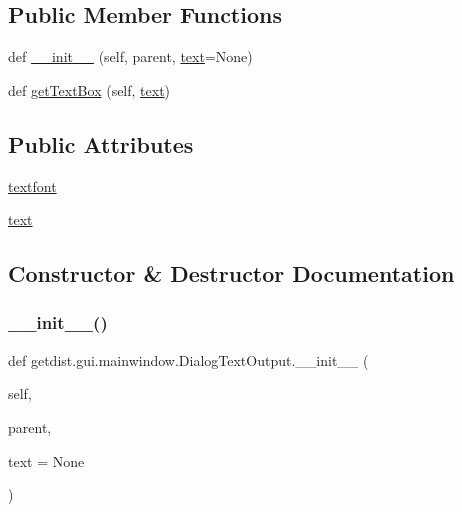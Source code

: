 \subsection*{Public Member Functions}
\begin{DoxyCompactItemize}
\item 
def \mbox{\hyperlink{classgetdist_1_1gui_1_1mainwindow_1_1DialogTextOutput_a77c71c2a72839cbef617f3a3051974cb}{\+\_\+\+\_\+init\+\_\+\+\_\+}} (self, parent, \mbox{\hyperlink{classgetdist_1_1gui_1_1mainwindow_1_1DialogTextOutput_acf6b51fc276d2a0f4b6860f1567f8575}{text}}=None)
\item 
def \mbox{\hyperlink{classgetdist_1_1gui_1_1mainwindow_1_1DialogTextOutput_acb8a428f1ffae2883c6d0602d8f2c313}{get\+Text\+Box}} (self, \mbox{\hyperlink{classgetdist_1_1gui_1_1mainwindow_1_1DialogTextOutput_acf6b51fc276d2a0f4b6860f1567f8575}{text}})
\end{DoxyCompactItemize}
\subsection*{Public Attributes}
\begin{DoxyCompactItemize}
\item 
\mbox{\hyperlink{classgetdist_1_1gui_1_1mainwindow_1_1DialogTextOutput_a69ffc7aa6ccad27e432f722f222336c6}{textfont}}
\item 
\mbox{\hyperlink{classgetdist_1_1gui_1_1mainwindow_1_1DialogTextOutput_acf6b51fc276d2a0f4b6860f1567f8575}{text}}
\end{DoxyCompactItemize}


\subsection{Constructor \& Destructor Documentation}
\mbox{\label{classgetdist_1_1gui_1_1mainwindow_1_1DialogTextOutput_a77c71c2a72839cbef617f3a3051974cb}} 
\subsubsection{\texorpdfstring{\+\_\+\+\_\+init\+\_\+\+\_\+()}{\_\_init\_\_()}}
{\footnotesize\ttfamily def getdist.\+gui.\+mainwindow.\+Dialog\+Text\+Output.\+\_\+\+\_\+init\+\_\+\+\_\+ (\begin{DoxyParamCaption}\item[{}]{self,  }\item[{}]{parent,  }\item[{}]{text = {\ttfamily None} }\end{DoxyParamCaption})}



